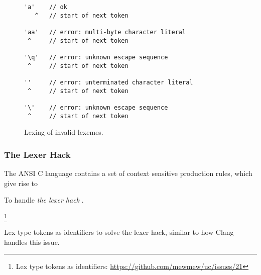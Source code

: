 \begin{figure}[htbp]
	\centering
\begin{BVerbatim}
'a'    // ok
   ^   // start of next token

'aa'   // error: multi-byte character literal
 ^     // start of next token

'\q'   // error: unknown escape sequence
 ^     // start of next token

''     // error: unterminated character literal
 ^     // start of next token

'\'    // error: unknown escape sequence
 ^     // start of next token
\end{BVerbatim}
	\caption{Lexing of invalid lexemes.}
	\label{fig:invalid_lexemes}
\end{figure}

\subsubsection{The Lexer Hack}

The ANSI C language contains a set of context sensitive production rules, which give rise to

To handle \textit{the lexer hack} \cite{the_lexer_hack}.

\footnote{Lex type tokens as identifiers: \url{https://github.com/mewmew/uc/issues/21}}

Lex type tokens as identifiers to solve the lexer hack, similar to how Clang handles this issue.
